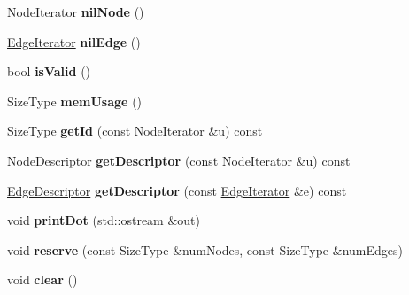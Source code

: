\begin{DoxyCompactItemize}
\item 
\hypertarget{class_packed_memory_array_impl_a4118feccd3f1933fb8b680eed6a12ef2}{
NodeIterator {\bfseries nilNode} ()}
\label{class_packed_memory_array_impl_a4118feccd3f1933fb8b680eed6a12ef2}

\item 
\hypertarget{class_packed_memory_array_impl_afea38878af1872045d1eadd0f78b4f3f}{
\hyperlink{class_packed_memory_array_1_1_iterator}{EdgeIterator} {\bfseries nilEdge} ()}
\label{class_packed_memory_array_impl_afea38878af1872045d1eadd0f78b4f3f}

\item 
\hypertarget{class_packed_memory_array_impl_a39da32b8de7b6c45bc64b9479f7d3934}{
bool {\bfseries isValid} ()}
\label{class_packed_memory_array_impl_a39da32b8de7b6c45bc64b9479f7d3934}

\item 
\hypertarget{class_packed_memory_array_impl_a7a3dc566573124c9cc52fdbf36d1a039}{
SizeType {\bfseries memUsage} ()}
\label{class_packed_memory_array_impl_a7a3dc566573124c9cc52fdbf36d1a039}

\item 
\hypertarget{class_packed_memory_array_impl_aabffdf31e9d825f20d4c79059cd0ca85}{
SizeType {\bfseries getId} (const NodeIterator \&u) const }
\label{class_packed_memory_array_impl_aabffdf31e9d825f20d4c79059cd0ca85}

\item 
\hypertarget{class_packed_memory_array_impl_ac319690e52bd5798a0527f3578da1646}{
\hyperlink{class_p_m_a_node}{NodeDescriptor} {\bfseries getDescriptor} (const NodeIterator \&u) const }
\label{class_packed_memory_array_impl_ac319690e52bd5798a0527f3578da1646}

\item 
\hypertarget{class_packed_memory_array_impl_a711355cc4f23ea3b2db474c238229e78}{
\hyperlink{class_p_m_a_edge}{EdgeDescriptor} {\bfseries getDescriptor} (const \hyperlink{class_packed_memory_array_1_1_iterator}{EdgeIterator} \&e) const }
\label{class_packed_memory_array_impl_a711355cc4f23ea3b2db474c238229e78}

\item 
\hypertarget{class_packed_memory_array_impl_acb60dbb084aa0b9cf541a926a61d62b2}{
void {\bfseries printDot} (std::ostream \&out)}
\label{class_packed_memory_array_impl_acb60dbb084aa0b9cf541a926a61d62b2}

\item 
\hypertarget{class_packed_memory_array_impl_a6c25b42a664e5b8b5c4bb832436bc3a6}{
void {\bfseries reserve} (const SizeType \&numNodes, const SizeType \&numEdges)}
\label{class_packed_memory_array_impl_a6c25b42a664e5b8b5c4bb832436bc3a6}

\item 
\hypertarget{class_packed_memory_array_impl_aed958a080f8c42ae8f290849a6c20a5c}{
void {\bfseries clear} ()}
\label{class_packed_memory_array_impl_aed958a080f8c42ae8f290849a6c20a5c}

\end{DoxyCompactItemize}
